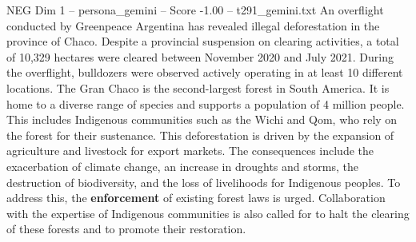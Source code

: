 \begin{textsample}{NEG Dim 1 – persona\_gemini – Score -1.00 – t291\_gemini.txt}  \label{ex:f1_neg_016}
An overflight conducted by Greenpeace Argentina has revealed illegal deforestation in the province of Chaco.
Despite a provincial suspension on clearing activities, a total of 10,329 hectares were cleared between November 2020 and July 2021.
During the overflight, bulldozers were observed actively operating in at least 10 different locations.
The Gran Chaco is the second-largest forest in South America.
It is home to a diverse range of species and supports a population of 4 million people.
This includes Indigenous communities such as the Wichi and Qom, who rely on the forest for their sustenance.
This deforestation is driven by the expansion of agriculture and livestock for export markets.
The consequences include the exacerbation of climate change, an increase in droughts and storms, the destruction of biodiversity, and the loss of livelihoods for Indigenous peoples.
To address this, the \textbf{enforcement} of existing forest laws is urged.
Collaboration with the expertise of Indigenous communities is also called for to halt the clearing of these forests and to promote their restoration.

\end{textsample}
